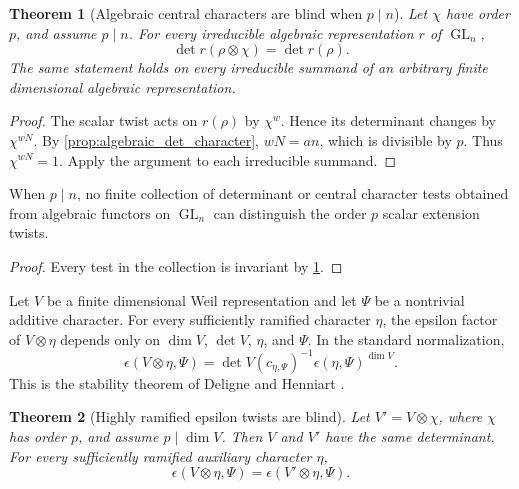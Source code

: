 \documentclass{aomart}
\newtheorem{theorem}{Theorem}[section]
\theoremstyle{definition}
\theoremstyle{remark}
\newcommand{\GL}{\operatorname{GL}}
\begin{document}
\begin{theorem}[Algebraic central characters are blind when \(p\mid n\)]\label{thm:central_character_no_go}
Let \(\chi\) have order \(p\), and assume \(p\mid n\). For every irreducible algebraic representation \(r\) of \(\GL_n\),
\[
\boxed{
 \det r(\rho\otimes\chi)=\det r(\rho).
}
\]
The same statement holds on every irreducible summand of an arbitrary finite dimensional algebraic representation.
\end{theorem}

\begin{proof}
The scalar twist acts on \(r(\rho)\) by \(\chi^w\). Hence its determinant changes by \(\chi^{wN}\). By \cref{prop:algebraic_det_character}, \(wN=an\), which is divisible by \(p\). Thus \(\chi^{wN}=1\). Apply the argument to each irreducible summand.
\end{proof}

\begin{corollary}\label{cor:rank_sieve_optimal}
When \(p\mid n\), no finite collection of determinant or central character tests obtained from algebraic functors on \(\GL_n\) can distinguish the order \(p\) scalar extension twists.
\end{corollary}

\begin{proof}
Every test in the collection is invariant by \cref{thm:central_character_no_go}.
\end{proof}

\begin{standardfact}\label{fact:epsilon_stability}
Let \(V\) be a finite dimensional Weil representation and let \(\Psi\) be a nontrivial additive character. For every sufficiently ramified character \(\eta\), the epsilon factor of \(V\otimes\eta\) depends only on \(\dim V\), \(\det V\), \(\eta\), and \(\Psi\). In the standard normalization,
\[
 \epsilon(V\otimes\eta,\Psi)
 =
 \det V(c_{\eta,\Psi})^{-1}
 \epsilon(\eta,\Psi)^{\dim V}.
\]
This is the stability theorem of Deligne and Henniart \cite{Deligne1973,DeligneHenniart1981}.
\end{standardfact}

\begin{theorem}[Highly ramified epsilon twists are blind]\label{thm:epsilon_no_go}
Let \(V' = V\otimes\chi\), where \(\chi\) has order \(p\), and assume \(p\mid\dim V\). Then \(V\) and \(V'\) have the same determinant. For every sufficiently ramified auxiliary character \(\eta\),
\[
\boxed{
 \epsilon(V\otimes\eta,\Psi)
 =
 \epsilon(V'\otimes\eta,\Psi).
}
\]
\end{theorem}
\end{document}
